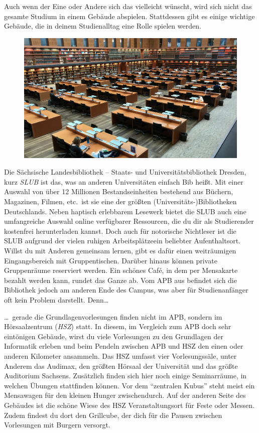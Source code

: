 
Auch wenn der Eine oder Andere sich das vielleicht wünscht, wird sich nicht das gesamte Studium in einem Gebäude abspielen.
Stattdessen gibt es einige wichtige Gebäude, die in deinem Studienalltag eine Rolle spielen werden.

\begin{figure}[b!]
    \centering
    \includegraphics[width=\linewidth]{img/slub-lesesaal}
\end{figure}

Die Sächsische Landesbibliothek – Staats- und Universitätsbibliothek Dresden, kurz \emph{SLUB} ist das, was an anderen Universitäten einfach Bib heißt.
Mit einer Auswahl von über 12 Millionen Bestandseinheiten bestehend aus Büchern, Magazinen, Filmen, etc.\ ist sie eine der größten (Universitäts-)Bibliotheken Deutschlands.
Neben haptisch erlebbarem Lesewerk bietet die SLUB auch eine umfangreiche Auswahl online verfügbarer Ressourcen, die du dir als Studierender kostenfrei herunterladen kannst.
Doch auch für notorische Nichtleser ist die SLUB aufgrund der vielen ruhigen Arbeitsplätzeein beliebter Aufenthaltsort.
Willst du mit Anderen gemeinsam lernen, gibt es dafür einen weiträumigen Eingangsbereich mit Gruppentischen.
Darüber hinaus können private Gruppenräume reserviert werden. Ein schönes Café, in dem per Mensakarte bezahlt werden kann, rundet das Ganze ab.
Vom APB aus befindet sich die Bibliothek jedoch am anderen Ende des Campus, was aber für Studienanfänger oft kein Problem darstellt. Denn\dots

\dots\ gerade die Grundlagenvorlesungen finden nicht im APB, sondern im Hörsaalzentrum (\emph{HSZ}) statt.
In diesem, im Vergleich zum APB doch sehr eintönigen Gebäude, wirst du viele Vorlesungen zu den Grundlagen der Informatik erleben und beim Pendeln zwischen APB und HSZ den einen oder anderen Kilometer ansammeln.
Das HSZ umfasst vier Vorlesungssäle, unter Anderem das Audimax, den größten Hörsaal der Universität und das größte Auditorium Sachsens.
Zusätzlich finden sich hier noch einige Seminarräume, in welchen Übungen stattfinden können. Vor dem \enquote{zentralen Kubus} steht meist ein Mensawagen für den kleinen Hunger zwischendurch.
Auf der anderen Seite des Gebäudes ist die schöne Wiese des HSZ Veranstaltungsort für Feste oder Messen.
Zudem findest du dort den Grillcube, der dich für die Pausen zwischen Vorlesungen mit Burgern versorgt.

